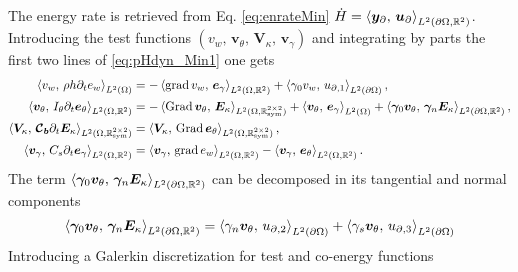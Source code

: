 The energy rate is retrieved from Eq. \eqref{eq:enrateMin} $\dot{H} = \inner[L^2(\partial\Omega, \mathbb{R}^2)]{\bm{y}_\partial}{\bm{u}_\partial}$. \newline
 Introducing the test functions $(v_w,\, \bm{v}_\theta, \, \bm{V}_\kappa, \, \bm{v}_\gamma)$ and integrating by parts the first two lines of \eqref{eq:pHdyn_Min1} one gets 
\begin{equation}\label{eq:weak_min_grad}
\begin{aligned}
\inner[L^2(\Omega)]{v_w}{\rho h \partial_t e_w} &= -\inner[L^2(\Omega, \mathbb{R}^{2})]{\grad v_w}{\bm{e}_\gamma} + \inner[L^2(\partial\Omega)]{\gamma_0 v_w}{{u}_{\partial, 1}}, \\
\inner[L^2(\Omega, \mathbb{R}^{2})]{\bm{v}_\theta}{I_\theta \partial_t \bm{e}_\theta} &= -\inner[L^2(\Omega, \mathbb{R}^{2\times 2}_{\text{sym}})]{\Grad \bm{v}_\theta}{\bm{E}_\kappa} + \inner[L^2(\Omega)]{\bm{v}_\theta}{\bm{e}_\gamma} + \inner[L^2(\partial\Omega, \mathbb{R}^2)]{\bm\gamma_0 \bm{v}_\theta}{\bm\gamma_n \bm{E}_{\kappa}}, \\
\inner[L^2(\Omega, \mathbb{R}^{2\times 2}_{\text{sym}})]{\bm{V}_\kappa}{\bm{\mathcal{C}_b} \partial_t \bm{E}_\kappa} &= \inner[L^2(\Omega, \mathbb{R}^{2\times 2}_{\text{sym}})]{\bm{V}_\kappa}{\Grad \bm{e}_\theta}, \\
\inner[L^2(\Omega, \mathbb{R}^{2})]{\bm{v}_\gamma}{C_s \partial_t \bm{e}_\gamma} &= \inner[L^2(\Omega, \mathbb{R}^{2})]{\bm{v}_\gamma}{\grad e_w} - \inner[L^2(\Omega, \mathbb{R}^{2})]{\bm{v}_\gamma}{\bm{e}_\theta}. \\
\end{aligned}
\end{equation}
The term $\inner[L^2(\partial\Omega, \mathbb{R}^2)]{\bm\gamma_0 \bm{v}_\theta}{\bm\gamma_n \bm{E}_{\kappa}}$ can be decomposed in its tangential and normal components
\begin{equation}
	\inner[L^2(\partial\Omega, \mathbb{R}^2)]{\bm\gamma_0 \bm{v}_\theta}{\bm\gamma_n \bm{E}_{\kappa}} = \inner[L^2(\partial\Omega)]{\gamma_n \bm{v}_\theta}{{u}_{\partial,2}} + \inner[L^2(\partial\Omega)]{\gamma_s \bm{v}_\theta}{{u}_{\partial,3}}
\end{equation}
Introducing a Galerkin discretization for test and co-energy functions
